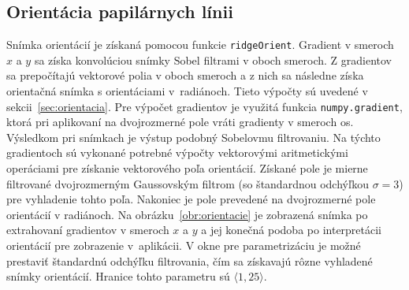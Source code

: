  \subsection{Orientácia papilárnych línii}
  Snímka orientácií je získaná pomocou funkcie \texttt{ridgeOrient}. Gradient v smeroch $x$ a $y$ sa získa konvolúciou snímky Sobel filtrami v oboch smeroch.
  Z gradientov sa prepočítajú vektorové polia v oboch smeroch a z nich sa následne získa orientačná snímka s orientáciami v~radiánoch. Tieto výpočty sú
  uvedené v sekcii~{\ref{sec:orientacia}}. Pre výpočet gradientov je využitá funkcia \texttt{numpy.gradient}, ktorá pri aplikovaní na dvojrozmerné pole
  vráti gradienty v smeroch os. Výsledkom pri snímkach je výstup podobný Sobelovmu filtrovaniu. Na týchto gradientoch sú vykonané potrebné výpočty vektorovými
  aritmetickými operáciami pre získanie vektorového poľa orientácií. Získané pole je mierne filtrované dvojrozmerným Gaussovským filtrom (so štandardnou
  odchýľkou $\sigma = 3$) pre vyhladenie tohto poľa. Nakoniec je pole prevedené na dvojrozmerné pole orientácií v radiánoch.
  Na obrázku~{\ref{obr:orientacie}} je zobrazená snímka po extrahovaní gradientov v smeroch $x$ a $y$ a jej konečná podoba po interpretácii orientácií pre
  zobrazenie v~aplikácii. V okne pre parametrizáciu je možné prestaviť štandardnú odchýľku filtrovania, čím sa získavajú rôzne vyhladené snímky orientácií.
  Hranice tohto parametru sú $\langle{}1,25\rangle{}$.


